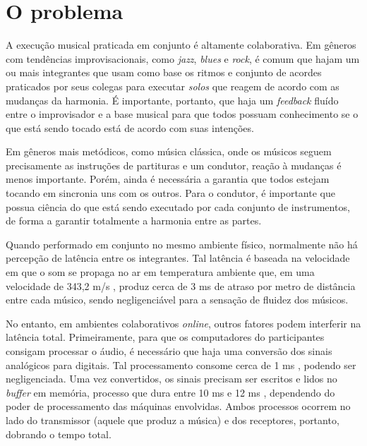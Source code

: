 \section{O problema}


A execução musical praticada em conjunto é altamente colaborativa. Em gêneros com tendências improvisacionais, como \textit{jazz}, \textit{blues} e \textit{rock}, é comum que hajam um ou mais integrantes que usam como base os ritmos e conjunto de acordes praticados por seus colegas para executar \textit{solos} que reagem de acordo com as mudanças da harmonia. É importante, portanto, que haja um \textit{feedback} fluído entre o improvisador e a base musical para que todos possuam conhecimento se o que está sendo tocado está de acordo com suas intenções.

Em gêneros mais metódicos, como música clássica, onde os músicos seguem precisamente as instruções de partituras e um condutor, reação à mudanças é menos importante. Porém, ainda é necessária a garantia que todos estejam tocando em sincronia uns com os outros. Para o condutor, é importante que possua ciência do que está sendo executado por cada conjunto de instrumentos, de forma a garantir totalmente a harmonia entre as partes.

Quando performado em conjunto no mesmo ambiente físico, normalmente não há percepção de latência entre os integrantes. Tal latência é baseada na velocidade em que o som se propaga no ar em temperatura ambiente que, em uma velocidade de 343,2 m/s \cite{speed_of_sound}, produz cerca de 3 ms de atraso por metro de distância entre cada músico, sendo negligenciável para a sensação de fluidez dos músicos.

No entanto, em ambientes colaborativos \textit{online}, outros fatores podem interferir na latência total. Primeiramente, para que os computadores do participantes consigam processar o áudio, é necessário que haja uma conversão dos sinais analógicos para digitais. Tal processamento consome cerca de 1 ms \cite{how_low_can_you_go}, podendo ser negligenciada. Uma vez convertidos, os sinais precisam ser escritos e lidos no \textit{buffer} em memória, processo que dura entre 10 ms e 12 ms \cite{how_low_can_you_go}, dependendo do poder de processamento das máquinas envolvidas. Ambos processos ocorrem no lado do transmissor (aquele que produz a música) e dos receptores, portanto, dobrando o tempo total.

